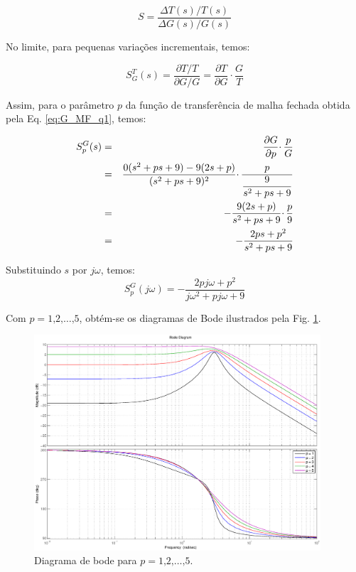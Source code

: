 \begin{equation}
S = \frac{\Delta T(s)/T(s)}{\Delta G(s)/G(s)}
\end{equation}

No limite, para pequenas variações incrementais, temos:

\begin{equation}
S_G^T(s) = \frac{\partial T / T}{ \partial G / G} 
         = \frac{\partial T}{\partial G} \cdotp \frac{G}{T}
\end{equation}

Assim, para o parâmetro $p$ da função de transferência de malha fechada
obtida pela Eq. \ref{eq:G_MF_q1}, temos:

\begin{eqnarray}
S_p^G(s) & = & \frac{\partial G}{\partial p} \cdotp \frac{p}{G}\nonumber \\
         & = & \frac{0(s^2 + ps + 9) - 9(2s+p)}{(s^2 + ps + 9)^2} \cdotp
               \frac{p}{\displaystyle\frac{9}{s^2 + ps + 9}}\nonumber\\
         & = & - \frac{9(2s+p)}{s^2 + ps + 9} \cdotp \frac{p}{9}\nonumber\\
         & = & - \frac{2ps + p^2}{s^2 + ps + 9}
\end{eqnarray}

Substituindo $s$ por $j\omega$, temos:
\begin{equation}
S_p^G(j\omega) = - \frac{2pj\omega + p^2}{j\omega^2 + pj\omega + 9}
\end{equation}

Com $p = 1\text{,} 2\text{,} \ldots\text{,} 5$, obtém-se os diagramas de Bode
ilustrados pela Fig. \ref{fig:diag_bode_q1}.

\begin{figure}[htb]
\centering
    \includegraphics[width=0.95\textwidth]{imgs/questao1/bode}
    \caption{Diagrama de bode para $p = 1\text{,} 2\text{,} \ldots\text{,} 5$.}
    \label{fig:diag_bode_q1}
\end{figure}

